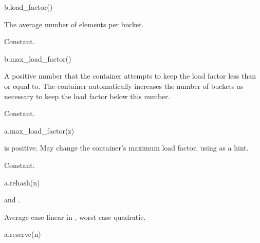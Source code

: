 %
\begin{itemdecl}
b.load_factor()
\end{itemdecl}

\begin{itemdescr}
\pnum
\result
{}

\pnum
\returns
The average number of elements per bucket.

\pnum
\complexity
Constant.
\end{itemdescr}

%
\begin{itemdecl}
b.max_load_factor()
\end{itemdecl}

\begin{itemdescr}
\pnum
\result
{}

\pnum
\returns
A positive number
that the container attempts to keep the load factor less than or equal to.
The container automatically increases the number of buckets as necessary
to keep the load factor below this number.

\pnum
\complexity
Constant.
\end{itemdescr}

%
\begin{itemdecl}
a.max_load_factor(z)
\end{itemdecl}

\begin{itemdescr}
\pnum
\result
{}

\pnum
\expects
{} is positive.
May change the container's maximum load factor, using  as a hint.

\pnum
\complexity
Constant.
\end{itemdescr}

%
\begin{itemdecl}
a.rehash(n)
\end{itemdecl}

\begin{itemdescr}
\pnum
\result
{}

\pnum
\ensures
{} and
.%

\pnum
\complexity
Average case linear in , worst case quadratic.
\end{itemdescr}

%
\begin{itemdecl}
a.reserve(n)
\end{itemdecl}

